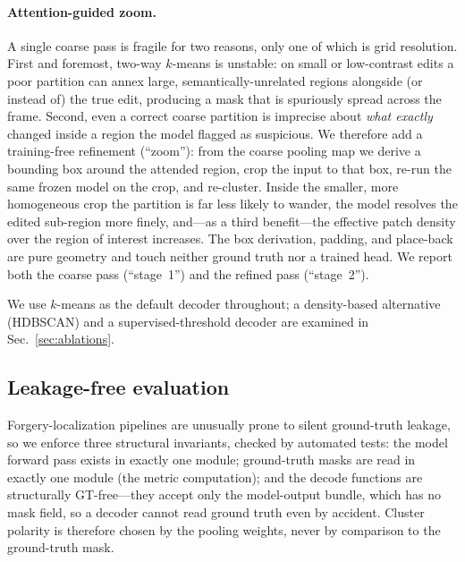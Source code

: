 \paragraph{Attention-guided zoom.}
A single coarse pass is fragile for two reasons, only one of which is grid
resolution. First and foremost, two-way $k$-means is unstable: on small or
low-contrast edits a poor partition can annex large, semantically-unrelated
regions alongside (or instead of) the true edit, producing a mask that is
spuriously spread across the frame. Second, even a correct coarse partition is
imprecise about \emph{what exactly} changed inside a region the model flagged as
suspicious. We therefore add a training-free refinement (``zoom''): from the
coarse pooling map we derive a bounding box around the attended region, crop the
input to that box, re-run the same frozen model on the crop, and re-cluster.
Inside the smaller, more homogeneous crop the partition is far less likely to
wander, the model resolves the edited sub-region more finely, and---as a third
benefit---the effective patch density over the region of interest increases. The
box derivation, padding, and place-back are pure geometry and touch neither
ground truth nor a trained head. We report both the coarse pass (``stage~1'')
and the refined pass (``stage~2'').

We use $k$-means as the default decoder throughout; a density-based alternative
(HDBSCAN) and a supervised-threshold decoder are examined in
Sec.~\ref{sec:ablations}.

\subsection{Leakage-free evaluation}
\label{sec:leakage}
Forgery-localization pipelines are unusually prone to silent ground-truth
leakage, so we enforce three structural invariants, checked by automated tests:
the model forward pass exists in exactly one module; ground-truth masks are read
in exactly one module (the metric computation); and the decode functions are
structurally GT-free---they accept only the model-output bundle, which has no
mask field, so a decoder cannot read ground truth even by accident. Cluster
polarity is therefore chosen by the pooling weights, never by comparison to the
ground-truth mask.

